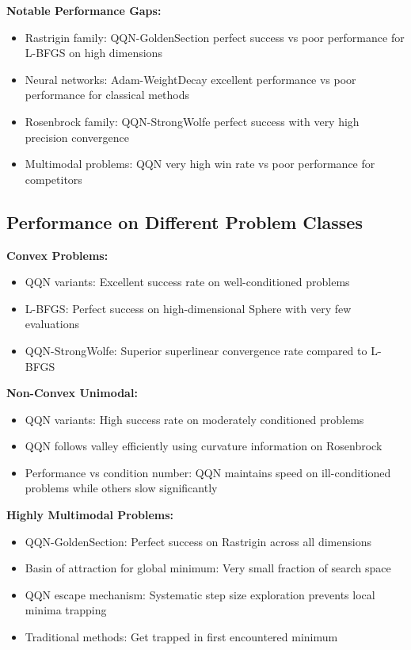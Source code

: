 \textbf{Notable Performance Gaps:}

\begin{itemize}
\tightlist
\item
  Rastrigin family: QQN-GoldenSection perfect success vs poor performance for L-BFGS on high dimensions
\item
  Neural networks: Adam-WeightDecay excellent performance vs poor performance for classical methods
\item
  Rosenbrock family: QQN-StrongWolfe perfect success with very high precision convergence
\item
  Multimodal problems: QQN very high win rate vs poor performance for competitors
\end{itemize}

\hypertarget{performance-on-different-problem-classes}{%
\subsection{Performance on Different Problem Classes}\label{performance-on-different-problem-classes}}

\textbf{Convex Problems:}

\begin{itemize}
\tightlist
\item
  QQN variants: Excellent success rate on well-conditioned problems
\item
  L-BFGS: Perfect success on high-dimensional Sphere with very few evaluations
\item
  QQN-StrongWolfe: Superior superlinear convergence rate compared to L-BFGS
\end{itemize}

\textbf{Non-Convex Unimodal:}

\begin{itemize}
\tightlist
\item
  QQN variants: High success rate on moderately conditioned problems
\item
  QQN follows valley efficiently using curvature information on Rosenbrock
\item
  Performance vs condition number: QQN maintains speed on ill-conditioned problems while others slow significantly
\end{itemize}

\textbf{Highly Multimodal Problems:}

\begin{itemize}
\tightlist
\item
  QQN-GoldenSection: Perfect success on Rastrigin across all dimensions
\item
  Basin of attraction for global minimum: Very small fraction of search space
\item
  QQN escape mechanism: Systematic step size exploration prevents local minima trapping
\item
  Traditional methods: Get trapped in first encountered minimum
\end{itemize}

